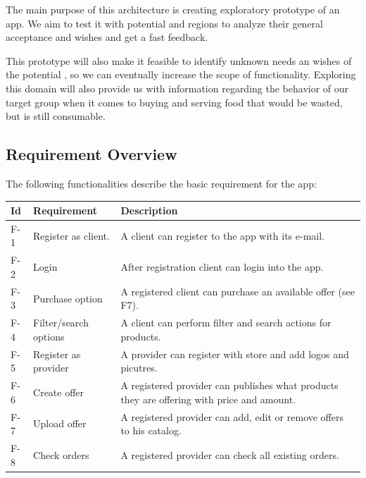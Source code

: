 The main purpose of this architecture is creating exploratory prototype of an \gls{app}. We aim to test it with potential 
 and regions to analyze their general acceptance and wishes \cite{refbook:DSHC} and get a fast feedback. 

This prototype will also make it feasible to identify unknown needs an wishes of the potential , so we 
can eventually increase the scope of functionality. Exploring this domain will also provide us with information regarding 
the behavior of our target group when it comes to buying and serving food that would be wasted, but is still consumable.

\subsection{Requirement Overview} \label{Requirement_Overview}

The following functionalities describe the basic requirement for the \gls{app}:

\begin{table}[H]
    \begin{tabularx}{\textwidth}{llX}
    \toprule
    Id & Requirement & Description  \\
    \midrule
    F-1 & Register as \gls{client}. & A \gls{client} can register to the app with its e-mail.\\
    F-2 & Login & After registration \gls{client} can login into the app. \\
    F-3 & Purchase option & A registered \gls{client} can purchase an available offer (see F7).\\
    F-4 & Filter/search options & A \gls{client} can perform filter and search actions for products.\\
    F-5 & Register as \gls{provider} & A \gls{provider} can register with store and add logos and picutres.\\
    F-6 & Create offer & A registered \gls{provider} can publishes what products they are offering with price 
    and amount. \\
    F-7 & Upload offer & A registered \gls{provider} can add, edit or remove offers to his catalog.\\
    F-8 & Check orders & A registered \gls{provider} can check all existing orders.\\
    \bottomrule
    \end{tabularx}
\end{table}

